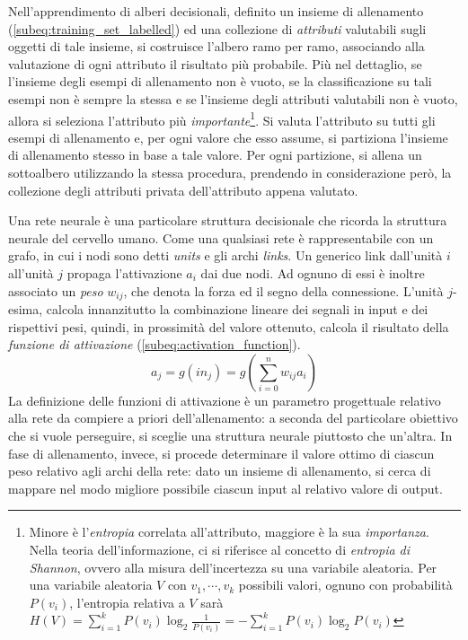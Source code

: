                Nell'apprendimento di alberi decisionali, definito un insieme di allenamento (\ref{subeq:training_set_labelled}) ed una collezione di \emph{attributi} valutabili sugli oggetti di tale insieme, si costruisce l'albero ramo per ramo, associando alla valutazione di ogni attributo il risultato più probabile.
                Più nel dettaglio, se l'insieme degli esempi di allenamento non è vuoto, se la classificazione su tali esempi non è sempre la stessa e se l'insieme degli attributi valutabili non è vuoto, allora si seleziona l'attributo più \emph{importante}\footnote{Minore è l'\emph{entropia} correlata all'attributo, maggiore è la sua \emph{importanza}. Nella teoria dell'informazione, ci si riferisce al concetto di \emph{entropia di Shannon}, ovvero alla misura dell'incertezza su una variabile aleatoria.
                Per una variabile aleatoria $V$ con $v_1,\cdots, v_k$ possibili valori, ognuno con probabilità $P(v_i)$, l'entropia relativa a $V$ sarà $H(V) = \sum_{i = 1}^{k}P(v_i)\log_2\frac{1}{P(v_i)} = - \sum_{i = 1}^{k}P(v_i)\log_2P(v_i)$}.
                Si valuta l'attributo su tutti gli esempi di allenamento e, per ogni valore che esso assume, si partiziona l'insieme di allenamento stesso in base a tale valore.
                Per ogni partizione, si allena un sottoalbero utilizzando la stessa procedura, prendendo in considerazione però, la collezione degli attributi privata dell'attributo appena valutato.

                Una rete neurale è una particolare struttura decisionale che ricorda la struttura neurale del cervello umano.
                Come una qualsiasi rete è rappresentabile con un grafo, in cui i nodi sono detti \emph{units} e gli archi \emph{links}.
                Un generico link dall'unità $i$ all'unità $j$ propaga l'attivazione $a_i$ dai due nodi. Ad ognuno di essi è inoltre associato un \emph{peso} $w_{ij}$, che denota la forza ed il segno della connessione.
                L'unità $j$-esima, calcola innanzitutto la combinazione lineare dei segnali in input e dei rispettivi pesi, quindi, in prossimità del valore ottenuto, calcola il risultato della \emph{funzione di attivazione} (\ref{subeq:activation_function}).
                \begin{equation}
                    \label{subeq:activation_function}
                    a_j = g(in_j) = g\left(\sum_{i = 0}^{n}w_{ij}a_i\right)
                \end{equation}
                La definizione delle funzioni di attivazione è un parametro progettuale relativo alla rete da compiere a priori dell'allenamento: a seconda del particolare obiettivo che si vuole perseguire, si sceglie una struttura neurale piuttosto che un'altra.
                In fase di allenamento, invece, si procede determinare il valore ottimo di ciascun peso relativo agli archi della rete: dato un insieme di allenamento, si cerca di mappare nel modo migliore possibile ciascun input al relativo valore di output.

